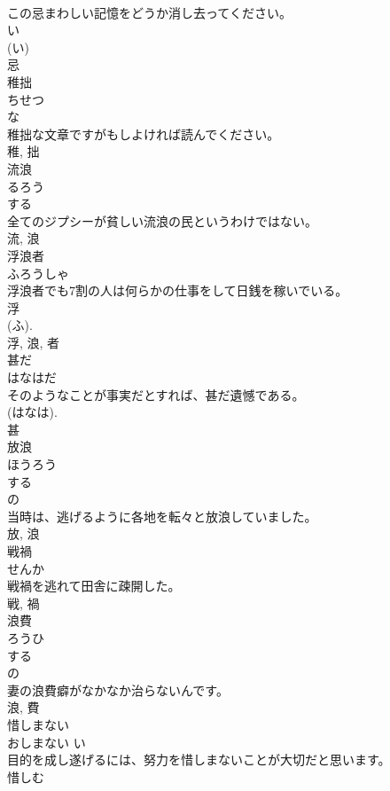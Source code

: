 \documentclass[8pt]{extreport}
\begin{document}
\begin{CJK}{UTF8}{min}
\\	この忌まわしい記憶をどうか消し去ってください。	
\\	い 
\\	(い) 
\\	忌	
\\	稚拙	
\\	ちせつ	
\\	な 
\\	稚拙な文章ですがもしよければ読んでください。	
\\	稚, 拙	
\\	流浪	
\\	るろう	
\\	する 
\\	全てのジプシーが貧しい流浪の民というわけではない。	
\\	流, 浪	
\\	浮浪者	
\\	ふろうしゃ	
\\	浮浪者でも7割の人は何らかの仕事をして日銭を稼いでいる。	
\\	浮 
\\	(ふ). 
\\	浮, 浪, 者	
\\	甚だ	
\\	はなはだ	
\\	そのようなことが事実だとすれば、甚だ遺憾である。	
\\	(はなは).
\\	甚	
\\	放浪	
\\	ほうろう	
\\	する 
\\	の 
\\	当時は、逃げるように各地を転々と放浪していました。	
\\	放, 浪	
\\	戦禍	
\\	せんか	
\\	戦禍を逃れて田舎に疎開した。	
\\	戦, 禍	
\\	浪費	
\\	ろうひ	
\\	する 
\\	の 
\\	妻の浪費癖がなかなか治らないんです。	
\\	浪, 費	
\\	惜しまない	
\\	おしまない	い 
\\	目的を成し遂げるには、努力を惜しまないことが大切だと思います。	
\\	惜しむ 

\end{CJK}
\end{document}
